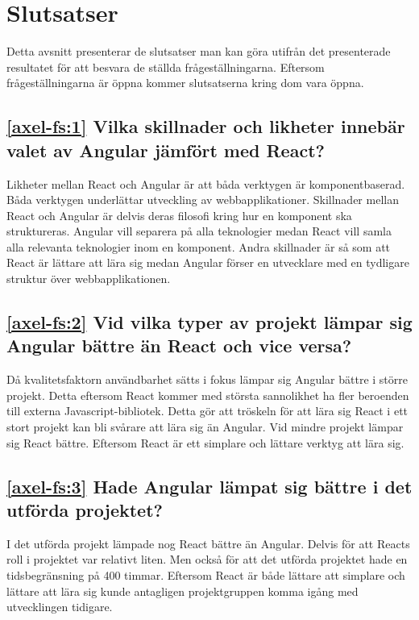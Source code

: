 \section{Slutsatser}
\label{sec:axel-conclusion}

Detta avsnitt presenterar de slutsatser man kan göra utifrån det presenterade resultatet för att besvara de ställda frågeställningarna. Eftersom frågeställningarna är öppna kommer slutsatserna kring dom vara öppna.

\subsection*{\ref{axel-fs:1} Vilka skillnader och likheter innebär valet av Angular jämfört med React?}
Likheter mellan React och Angular är att båda verktygen är komponentbaserad. Båda verktygen underlättar utveckling av webbapplikationer. Skillnader mellan React och Angular är delvis deras filosofi kring hur en komponent ska struktureras. Angular vill separera på alla teknologier medan React vill samla alla relevanta teknologier inom en komponent. Andra skillnader är så som att React är lättare att lära sig medan Angular förser en utvecklare med en tydligare struktur över webbapplikationen.

\subsection*{\ref{axel-fs:2} Vid vilka typer av projekt lämpar sig Angular bättre än React och vice versa?}
Då kvalitetsfaktorn användbarhet sätts i fokus lämpar sig Angular bättre i större projekt. Detta eftersom React kommer med största sannolikhet ha fler beroenden till externa Javascript-bibliotek. Detta gör att tröskeln för att lära sig React i ett stort projekt kan bli svårare att lära sig än Angular. Vid mindre projekt lämpar sig React bättre. Eftersom React är ett simplare och lättare verktyg att lära sig.
 
\subsection*{\ref{axel-fs:3}  Hade Angular lämpat sig bättre i det utförda projektet?}
I det utförda projekt lämpade nog React bättre än Angular. Delvis för att Reacts roll i projektet var relativt liten. Men också för att det utförda projektet hade en tidsbegränsning på 400 timmar. Eftersom React är både lättare att simplare och lättare att lära sig kunde antagligen projektgruppen komma igång med utvecklingen tidigare.
